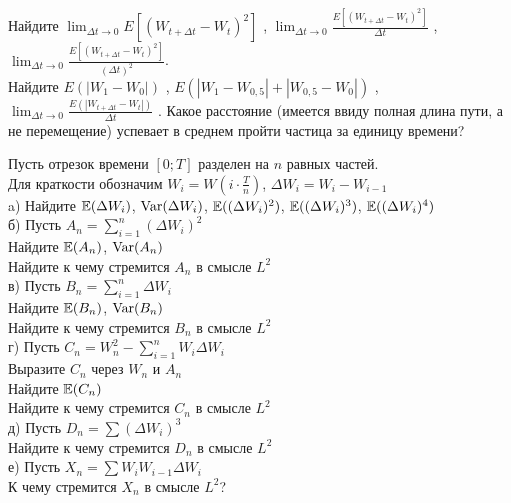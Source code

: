 \begin{problem}
Найдите $\lim_{\Delta t \to 0} E\left[ {\left( {W_{t + \Delta t} -
W_t } \right)^2 } \right]$ , $\lim_{\Delta t \to 0} \frac{{E\left[
{\left( {W_{t + \Delta t} - W_t } \right)^2 } \right]}} {{\Delta
t}}$ , $\lim_{\Delta t \to 0} \frac{{E\left[ {\left( {W_{t +
\Delta t} - W_t } \right)^2 } \right]}} {{\left( {\Delta t}
\right)^2 }}$. \\
Найдите $E\left( {\left| {W_1  - W_0 } \right|} \right)$ ,
$E\left( {\left| {W_1  - W_{0,5} } \right| + \left| {W_{0,5}  -
W_0 } \right|} \right)$ , $\lim_{\Delta t \to 0} \frac{{E\left(
{\left| {W_{t + \Delta t} - W_t } \right|} \right)}} {{\Delta t}}$
. Какое расстояние (имеется ввиду полная длина пути, а не
перемещение) успевает в среднем пройти частица за единицу времени?

\begin{sol}

\end{sol}
\end{problem}

\begin{problem}
Пусть отрезок времени $[0;T]$ разделен на $n$ равных частей. \\
Для краткости обозначим $W_{i}=W(i\cdot \frac{T}{n})$, $\Delta W_{i}=W_{i}-W_{i-1}$ \\
a) Найдите $\mathbb{E}(\Delta W_{i})$, $\operatorname{Var}(\Delta W_{i})$, $\mathbb{E}((\Delta W_{i})^{2})$, $\mathbb{E}((\Delta W_{i})^{3})$, $\mathbb{E}((\Delta W_{i})^{4})$ \\
б) Пусть $A_{n}=\sum_{i=1}^{n}(\Delta W_{i})^{2}$ \\
Найдите $\mathbb{E}(A_{n})$, $\operatorname{Var}(A_{n})$ \\
Найдите к чему стремится $A_{n}$ в смысле $L^{2}$ \\
в) Пусть $B_{n}=\sum_{i=1}^{n}\Delta W_{i}$ \\
Найдите $\mathbb{E}(B_{n})$, $\operatorname{Var}(B_{n})$ \\
Найдите к чему стремится $B_{n}$ в смысле $L^{2}$ \\
г) Пусть $C_{n}=W_{n}^{2}-\sum_{i=1}^{n}W_{i}\Delta W_{i}$ \\
Выразите $C_{n}$ через $W_{n}$ и $A_{n}$ \\
Найдите $\mathbb{E}(C_{n})$ \\
Найдите к чему стремится $C_{n}$ в смысле $L^{2}$ \\
д) Пусть $D_{n}=\sum (\Delta W_{i})^{3}$ \\
Найдите к чему стремится $D_{n}$ в смысле $L^{2}$ \\
е) Пусть $X_{n}=\sum W_{i}W_{i-1}\Delta W_{i}$ \\
К чему стремится $X_{n}$ в смысле $L^{2}$?

\begin{sol}

\end{sol}
\end{problem}

